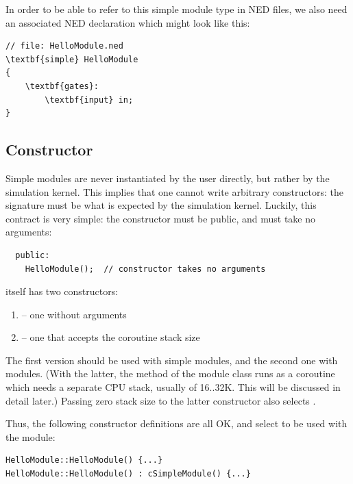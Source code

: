 In order to be able to refer to this simple module type
in NED files, we also need an associated NED declaration which might
look like this:

\begin{Verbatim}[commandchars=\\\{\}]
// file: HelloModule.ned
\textbf{simple} HelloModule
{
    \textbf{gates}:
        \textbf{input} in;
}
\end{Verbatim}


\subsection{Constructor}

Simple modules are never instantiated by the user directly, but rather by
the simulation kernel. This implies that one cannot write arbitrary
constructors: the signature must be what is expected by the simulation kernel.
Luckily, this contract is very simple: the constructor must be public, and must take
no arguments:

\begin{verbatim}
  public:
    HelloModule();  // constructor takes no arguments
\end{verbatim}

 itself has two constructors:
\begin{enumerate}
  \item{ -- one without arguments}
  \item{ -- one that accepts the coroutine
        stack size}
\end{enumerate}

The first version should be used with  simple modules,
and the second one with  modules.
(With the latter, the  method of the module class
runs as a coroutine which needs a separate CPU stack,
usually of 16..32K. This will be discussed in detail later.)
Passing zero stack size to the latter constructor also selects .

Thus, the following constructor definitions are all OK, and select
 to be used with the module:

\begin{verbatim}
HelloModule::HelloModule() {...}
HelloModule::HelloModule() : cSimpleModule() {...}
\end{verbatim}

